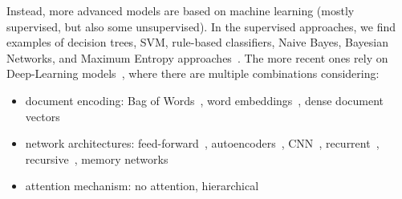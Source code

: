 Instead, more advanced models are based on machine learning (mostly supervised, but also some unsupervised).
In the supervised approaches, we find examples of decision trees, SVM, rule-based classifiers, Naive Bayes, Bayesian Networks, and Maximum Entropy approaches~\citep{zharmagambetov2015sentiment,bayhaqy2018sentiment,fitri2019sentiment,rathi2018sentiment,xie2019improved}.
The more recent ones rely on Deep-Learning models~\citep{zhang2018deep}, where there are multiple combinations considering:
\begin{itemize}
    \item document encoding: Bag of Words~\citep{moraes2013document,zhai2016semisupervised}, word embeddings~\citep{tang2015document,chen2016neural}, dense document vectors~\citep{le2014distributed}
    \item network architectures: feed-forward~\citep{duncan2015neural}, autoencoders~\citep{zhai2016semisupervised,wu2019semi}, CNN~\citep{jianqiang2018deep,sun2019aspect}, recurrent~\citep{chen2017recurrent,xu2016cached}, recursive~\citep{wang2016recursive,nguyen2015phrasernn}, memory networks~\citep{li2017end,lv2021aspect}
    \item attention mechanism: no attention, hierarchical~\citep{zhou2016attention} %
\end{itemize}




